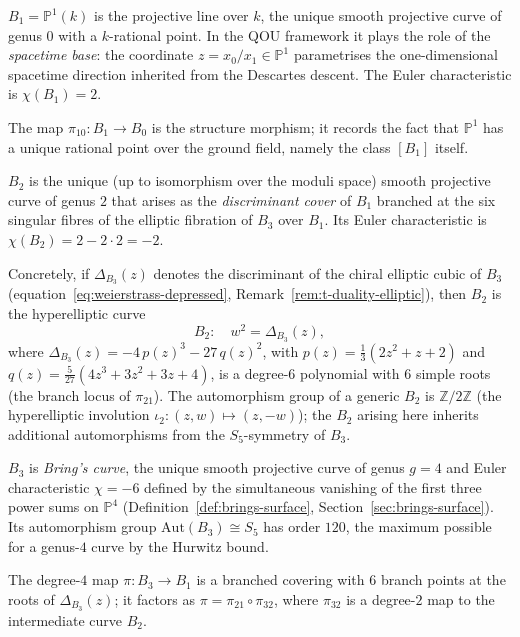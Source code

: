 \begin{remark}[$B_1 = \mathbb{P}^1(k)$, genus $0$]
\label{rem:B1-projective-line}
$B_1 = \mathbb{P}^1(k)$ is the projective line over $k$, the unique
smooth projective curve of genus $0$ with a $k$-rational point.  In
the QOU framework it plays the role of the \emph{spacetime base}: the
coordinate $z = x_0/x_1 \in \mathbb{P}^1$ parametrises the
one-dimensional spacetime direction inherited from the Descartes
descent.  The Euler characteristic is $\chi(B_1) = 2$.

The map $\pi_{10}\colon B_1 \to B_0$ is the structure morphism; it
records the fact that $\mathbb{P}^1$ has a unique rational point over the
ground field, namely the class $[B_1]$ itself.
\end{remark}

\begin{remark}[$B_2$, genus $2$]
\label{rem:B2-genus2}
$B_2$ is the unique (up to isomorphism over the moduli space) smooth
projective curve of genus $2$ that arises as the \emph{discriminant cover}
of $B_1$ branched at the six singular fibres of the elliptic fibration
of $B_3$ over $B_1$.  Its Euler characteristic is
$\chi(B_2) = 2 - 2\cdot 2 = -2$.

Concretely, if $\Delta_{B_3}(z)$ denotes the discriminant of the chiral
elliptic cubic of $B_3$
(equation~\eqref{eq:weierstrass-depressed}, Remark~\ref{rem:t-duality-elliptic}),
then $B_2$ is the hyperelliptic curve
\begin{equation}\label{eq:B2-hyperelliptic}
  B_2\colon\quad w^2 = \Delta_{B_3}(z),
\end{equation}
where $\Delta_{B_3}(z) = -4\,p(z)^3 - 27\,q(z)^2$, with
$p(z) = \tfrac{1}{3}(2z^2+z+2)$ and
$q(z) = \tfrac{5}{27}(4z^3+3z^2+3z+4)$, is a degree-$6$ polynomial
with $6$ simple roots (the branch locus of $\pi_{21}$).
The automorphism group of a generic $B_2$ is $\mathbb{Z}/2\mathbb{Z}$
(the hyperelliptic involution $\iota_2\colon(z,w)\mapsto(z,-w)$);
the $B_2$ arising here inherits additional automorphisms from the
$S_5$-symmetry of $B_3$.
\end{remark}

\begin{remark}
\label{rem:B3-brings-surface}
$B_3$ is \emph{Bring's curve}, the unique smooth projective curve of
genus $g = 4$ and Euler characteristic $\chi = -6$ defined by the
simultaneous vanishing of the first three power sums on $\mathbb{P}^4$
(Definition~\ref{def:brings-surface}, Section~\ref{sec:brings-surface}).
Its automorphism group $\mathrm{Aut}(B_3) \cong S_5$ has order $120$,
the maximum possible for a genus-$4$ curve by the Hurwitz bound.

The degree-$4$ map $\pi\colon B_3 \to B_1$ is a branched covering with
$6$ branch points at the roots of $\Delta_{B_3}(z)$; it factors as
$\pi = \pi_{21} \circ \pi_{32}$, where $\pi_{32}$ is a degree-$2$ map
to the intermediate curve $B_2$.
\end{remark}

